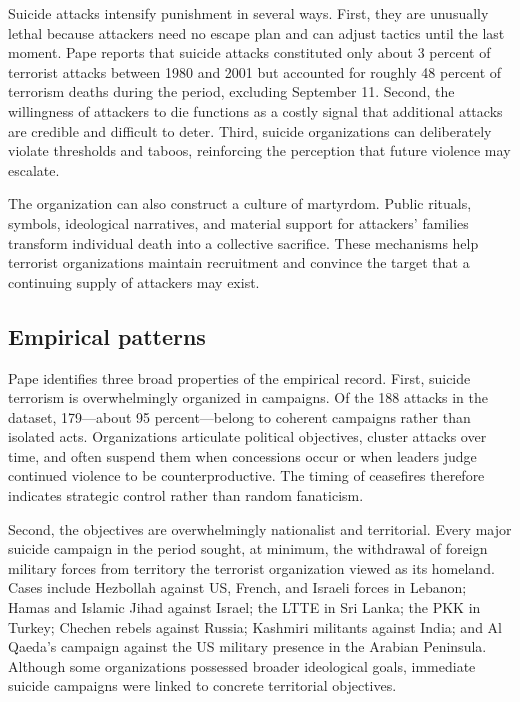 Suicide attacks intensify punishment in several ways. First, they are unusually lethal because attackers need no escape plan and can adjust tactics until the last moment. Pape reports that suicide attacks constituted only about 3 percent of terrorist attacks between 1980 and 2001 but accounted for roughly 48 percent of terrorism deaths during the period, excluding September 11. Second, the willingness of attackers to die functions as a costly signal that additional attacks are credible and difficult to deter. Third, suicide organizations can deliberately violate thresholds and taboos, reinforcing the perception that future violence may escalate.

The organization can also construct a culture of martyrdom. Public rituals, symbols, ideological narratives, and material support for attackers' families transform individual death into a collective sacrifice. These mechanisms help terrorist organizations maintain recruitment and convince the target that a continuing supply of attackers may exist.

\subsection{Empirical patterns}

Pape identifies three broad properties of the empirical record. First, suicide terrorism is overwhelmingly organized in campaigns. Of the 188 attacks in the dataset, 179---about 95 percent---belong to coherent campaigns rather than isolated acts. Organizations articulate political objectives, cluster attacks over time, and often suspend them when concessions occur or when leaders judge continued violence to be counterproductive. The timing of ceasefires therefore indicates strategic control rather than random fanaticism.

Second, the objectives are overwhelmingly nationalist and territorial. Every major suicide campaign in the period sought, at minimum, the withdrawal of foreign military forces from territory the terrorist organization viewed as its homeland. Cases include Hezbollah against US, French, and Israeli forces in Lebanon; Hamas and Islamic Jihad against Israel; the LTTE in Sri Lanka; the PKK in Turkey; Chechen rebels against Russia; Kashmiri militants against India; and Al Qaeda's campaign against the US military presence in the Arabian Peninsula. Although some organizations possessed broader ideological goals, immediate suicide campaigns were linked to concrete territorial objectives.

